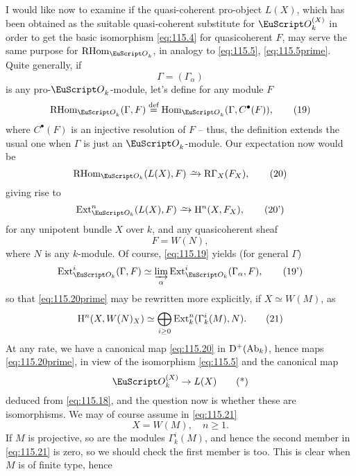 I would like now to examine if the quasi-coherent pro-object $L(X)$,
which has been obtained as the suitable quasi-coherent substitute for
$\scrO_k^{(X)}$ in order to get the basic isomorphism \eqref{eq:115.4}
for quasicoherent $F$, may serve the same purpose for
$\RHom_{\scrO_k}$, in analogy to \eqref{eq:115.5},
\eqref{eq:115.5prime}. Quite generally, if
\[\Gamma=(\Gamma_\alpha)\]
is any pro-$\scrO_k$-module, let's define for any module $F$
\begin{equation}
  \label{eq:115.19}
  \RHom_{\scrO_k}(\Gamma,F) \eqdef \Hom_{\scrO_k}(\Gamma,C^\bullet(F)),\tag{19}
\end{equation}
where $C^\bullet(F)$ is an injective resolution of $F$ -- thus, the
definition extends the usual one when $\Gamma$ is just an
$\scrO_k$-module. Our expectation now would be
\begin{equation}
  \label{eq:115.20}
  \RHom_\scrOk(L(X),F) \tosim \RGamma_X(F_X),\tag{20}
\end{equation}
giving rise to
\begin{equation}
  \label{eq:115.20prime}
  \Ext_\scrOk^n(L(X),F) \tosim \mathrm H^n(X,F_X),\tag{20'}
\end{equation}
for any unipotent bundle $X$ over $k$, and any
quasicoherent sheaf
\[F=W(N),\]
where $N$ is any $k$-module. Of course, \eqref{eq:115.19} yields (for
general $\Gamma$)
\begin{equation}
  \label{eq:115.19prime}
  \Ext_\scrOk^i(\Gamma,F)\simeq \varinjlim_\alpha\Ext_\scrOk^i(\Gamma_\alpha,F),\tag{19'}
\end{equation}
so that \eqref{eq:115.20prime} may be rewritten more explicitly, if
$X\simeq W(M)$, as
\begin{equation}
  \label{eq:115.21}
  \mathrm H^n(X,W(N)_X) \simeq \bigoplus_{i\ge0}\operatorname{Ext}_k^n(\Gamma_k^i(M),N).\tag{21}
\end{equation}
At any rate, we have a canonical map \eqref{eq:115.20} in
${\mathrm{D}}^+(\operatorname{Ab}_k)$, hence maps \eqref{eq:115.20prime}, in view of the
isomorphism \eqref{eq:115.5} and the canonical map
\begin{equation}
  \label{eq:115.star}
  \scrO_k^{(X)} \to L(X)\tag{*}
\end{equation}
deduced from \eqref{eq:115.18}, and the question now is whether these
are isomorphisms. We may of course assume in \eqref{eq:115.21}
\[X=W(M),\quad n\ge1.\]
If $M$ is projective, so are the modules $\Gamma_k^i(M)$, and hence
the second member in \eqref{eq:115.21} is zero, so we should check the
first member is too. This is clear when $M$ is of finite type, hence

